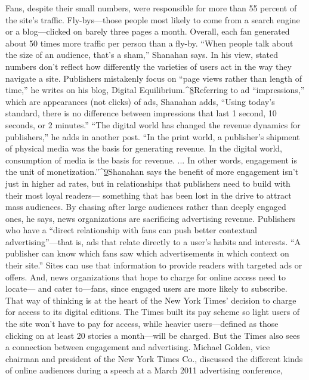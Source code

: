Fans, despite their small numbers, were responsible for more than 55 percent of
the site's traffic. Fly-bys—those people most likely to come from a search engine
or a blog—clicked on barely three pages a month. Overall, each fan generated
about 50 times more traffic per person than a fly-by.
``When people talk about the size of an audience, that's a sham,'' Shanahan says.
In his view, stated numbers don't reflect how differently the varieties of users act
in the way they navigate a site. Publishers mistakenly focus on ``page views rather
than length of time,'' he writes on his blog, Digital Equilibrium.^{\href{#endnotes-chapter-2}{8}}Referring to ad
``impressions,'' which are appearances (not clicks) of ads, Shanahan adds, ``Using
today's standard, there is no difference between impressions that last 1 second, 10
seconds, or 2 minutes.''
``The digital world has changed the revenue dynamics for publishers,'' he adds
in another post. ``In the print world, a publisher's shipment of physical media was
the basis for generating revenue. In the digital world, consumption of media is
the basis for revenue. ... In other words, engagement is the unit of monetization.''^{\href{#endnotes-chapter-2}{9}}Shanahan says the benefit of more engagement isn't just in higher ad rates,
but in relationships that publishers need to build with their most loyal readers—
something that has been lost in the drive to attract mass audiences. By chasing
after large audiences rather than deeply engaged ones, he says, news organizations
are sacrificing advertising revenue. Publishers who have a ``direct relationship
with fans can push better contextual advertising''—that is, ads that relate directly
to a user's habits and interests. ``A publisher can know which fans saw which
advertisements in which context on their site.'' Sites can use that information to
provide readers with targeted ads or offers.
And, news organizations that hope to charge for online access need to locate—
and cater to—fans, since engaged users are more likely to subscribe. That
way of thinking is at the heart of the New York Times' decision to charge for
access to its digital editions. The Times built its pay scheme so light users of the
site won't have to pay for access, while heavier users—defined as those clicking
on at least 20 stories a month—will be charged. But the Times also sees a
connection between engagement and advertising. Michael Golden, vice chairman
and president of the New York Times Co., discussed the different kinds
of online audiences during a speech at a March 2011 advertising conference,

